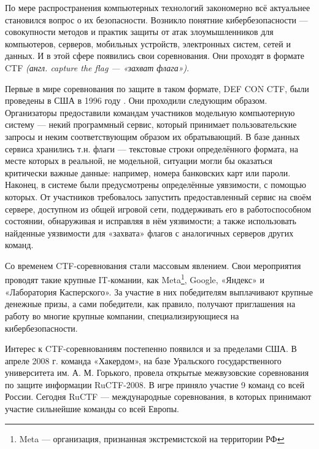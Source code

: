 По мере распространения компьютерных технологий закономерно всё актуальнее становился вопрос о их безопасности. Возникло понятние кибербезопасности --- совокупности методов и практик защиты от атак злоумышленников для компьютеров, серверов, мобильных устройств, электронных систем, сетей и данных. И в этой сфере появились свои соревнования. Они проходят в формате CTF \textit{(англ. capture the flag --- «захват флага»)}.



Первые в мире соревнования по защите в таком формате, DEF CON CTF, были проведены в США в 1996 году \cite{Defcon}. Они проходили следующим образом. Организаторы предоставили командам участников модельную компьютерную систему --- некий программный сервис, который принимает пользовательские запросы и неким соответствующим образом их обратывающий. В базе данных сервиса хранились т.н. флаги --- текстовые строки определённого формата, на месте которых в реальной, не модельной, ситуации могли бы оказаться критически важные данные: например, номера банковских карт или пароли. Наконец, в системе были предусмотрены определённые уявзимости, с помощью которых. От участников требовалось запустить предоставленный сервис на своём сервере, доступном из общей игровой сети, поддерживать его в работоспособном состоянии, обнаруживая и исправляя в нём уязвимости; а также использовать найденные уязвимости для «захвата» флагов с аналогичных серверов других команд.

Со временем CTF-соревнования стали массовым явлением. Свои мероприятия проводят такие крупные IT-комании, как Meta\cite{FBCTF}\footnote{Meta — организация, признанная экстремистской на территории РФ}, Google\cite{GoogleCTF}, «Яндекс»\cite{YaCTF} и «Лаборатория Касперского»\cite{KasperskyCTF}. За участие в них победителям выплачивают крупные денежные призы, а сами победители, как правило, получают приглашения на работу во многие крупные компании, специализирующиеся на кибербезопасности.

Интерес к CTF-соревнованиям постепенно появился и за пределами США. В апреле 2008 г. команда «Хакердом», на базе Уральского государственного университета им. А. М. Горького, провела открытые межвузовские соревнования по защите информации RuCTF-2008. В игре приняло участие 9 команд со всей России\cite{Hackerdom08}. Сегодня RuCTF --- международные соревнования, в которых принимают участие сильнейшие команды со всей Европы\cite{Hackerdom20}.


